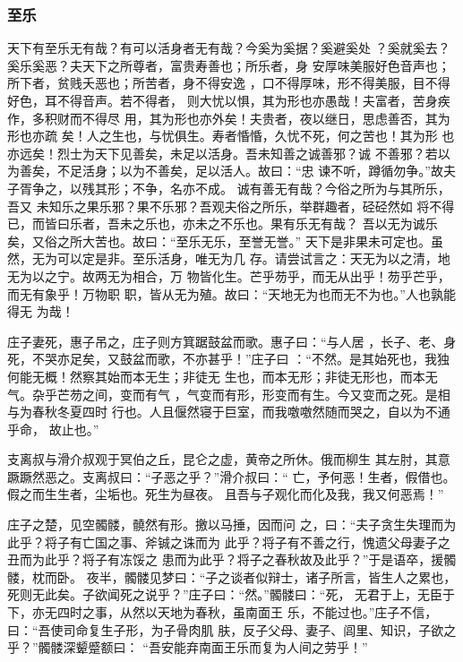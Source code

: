 \documentclass[]{article}
\begin{document}
\hypertarget{header-n805}{%
\subsubsection{至乐}\label{header-n805}}

天下有至乐无有哉？有可以活身者无有哉？今奚为奚据？奚避奚处
？奚就奚去？奚乐奚恶？夫天下之所尊者，富贵寿善也；所乐者，身
安厚味美服好色音声也；所下者，贫贱夭恶也；所苦者，身不得安逸
，口不得厚味，形不得美服，目不得好色，耳不得音声。若不得者，
则大忧以惧，其为形也亦愚哉！夫富者，苦身疾作，多积财而不得尽
用，其为形也亦外矣！夫贵者，夜以继日，思虑善否，其为形也亦疏
矣！人之生也，与忧俱生。寿者惛惛，久忧不死，何之苦也！其为形
也亦远矣！烈士为天下见善矣，未足以活身。吾未知善之诚善邪？诚
不善邪？若以为善矣，不足活身；以为不善矣，足以活人。故曰：``忠
谏不听，蹲循勿争。''故夫子胥争之，以残其形；不争，名亦不成。
诚有善无有哉？今俗之所为与其所乐，吾又
未知乐之果乐邪？果不乐邪？吾观夫俗之所乐，举群趣者，硁硁然如
将不得已，而皆曰乐者，吾未之乐也，亦未之不乐也。果有乐无有哉？
吾以无为诚乐矣，又俗之所大苦也。故曰：``至乐无乐，至誉无誉。''
天下是非果未可定也。虽然，无为可以定是非。至乐活身，唯无为几
存。请尝试言之：天无为以之清，地无为以之宁。故两无为相合，万
物皆化生。芒乎芴乎，而无从出乎！芴乎芒乎，而无有象乎！万物职
职，皆从无为殖。故曰：``天地无为也而无不为也。''人也孰能得无 为哉！

庄子妻死，惠子吊之，庄子则方箕踞鼓盆而歌。惠子曰：``与人居
，长子、老、身死，不哭亦足矣，又鼓盆而歌，不亦甚乎！''庄子曰
：``不然。是其始死也，我独何能无概！然察其始而本无生；非徒无
生也，而本无形；非徒无形也，而本无气。杂乎芒芴之间，变而有气
，气变而有形，形变而有生。今又变而之死。是相与为春秋冬夏四时
行也。人且偃然寝于巨室，而我噭噭然随而哭之，自以为不通乎命， 故止也。''

支离叔与滑介叔观于冥伯之丘，昆仑之虚，黄帝之所休。俄而柳生
其左肘，其意蹶蹶然恶之。支离叔曰：``子恶之乎？''滑介叔曰：``
亡，予何恶！生者，假借也。假之而生生者，尘垢也。死生为昼夜。
且吾与子观化而化及我，我又何恶焉！''

庄子之楚，见空髑髅，髐然有形。撽以马捶，因而问
之，曰：``夫子贪生失理而为此乎？将子有亡国之事、斧铖之诛而为
此乎？将子有不善之行，愧遗父母妻子之丑而为此乎？将子有冻馁之
患而为此乎？将子之春秋故及此乎？''于是语卒，援髑髅，枕而卧。
夜半，髑髅见梦曰：``子之谈者似辩士，诸子所言，皆生人之累也，
死则无此矣。子欲闻死之说乎？''庄子曰：``然。''髑髅曰：``死，
无君于上，无臣于下，亦无四时之事，从然以天地为春秋，虽南面王
乐，不能过也。''庄子不信，曰：``吾使司命复生子形，为子骨肉肌
肤，反子父母、妻子、闾里、知识，子欲之乎？''髑髅深颦蹙额曰：
``吾安能弃南面王乐而复为人间之劳乎！''
\end{document}
